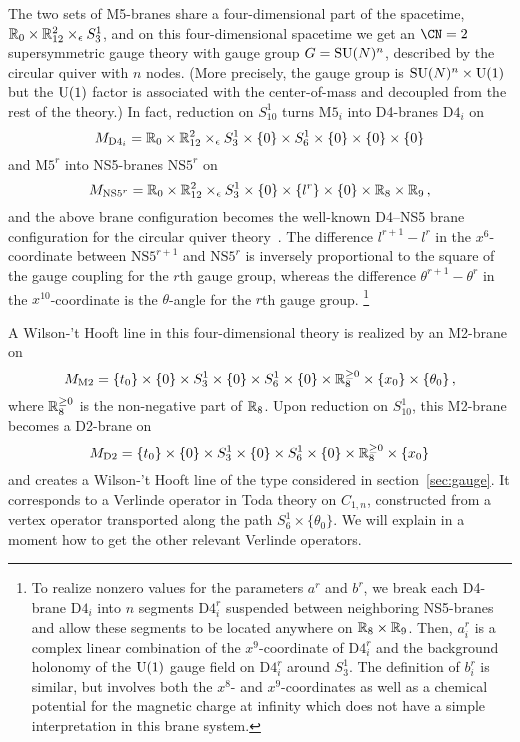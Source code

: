 The two sets of M5-branes share a four-dimensional part of the
spacetime, $\mathbb{R}_0 \times \mathbb{R}^2_{12} \times_\epsilon S^1_3$, and on this
four-dimensional spacetime we get an $\CN = 2$ supersymmetric gauge
theory with gauge group $G = \mathrm{SU}(N)^n$, described by the circular
quiver with $n$ nodes.  (More precisely, the gauge group is
$\mathrm{SU}(N)^n \times \mathrm{U}(1)$ but the $\mathrm{U}(1)$ factor is associated with the
center-of-mass and decoupled from the rest of the theory.)  In fact,
reduction on $S^1_{10}$ turns $\mathrm{M5}_i$ into D4-branes
$\mathrm{D4}_i$ on
\begin{equation}
  M_{\mathrm{D4}_i} =
  \mathbb{R}_0 \times \mathbb{R}^2_{12} \times_\epsilon S^1_3 \times \{0\}
  \times S^1_6 \times \{0\} \times \{0\} \times \{0\}
\end{equation}
and $\mathrm{M5}^r$ into NS5-branes $\mathrm{NS5}^r$ on
\begin{equation}
  M_{\mathrm{NS5}^r} =
  \mathbb{R}_0 \times \mathbb{R}^2_{12} \times_\epsilon S^1_3 \times \{0\}
  \times \{l^r\} \times \{0\} \times \mathbb{R}_8 \times \mathbb{R}_9 \,,
\end{equation}
and the above brane configuration becomes the well-known D4--NS5 brane
configuration for the circular quiver theory~\cite{Witten:1997sc}.
The difference $l^{r+1} - l^r$ in the $x^6$-coordinate between
$\mathrm{NS5}^{r+1}$ and $\mathrm{NS5}^r$ is inversely proportional to
the square of the gauge coupling for the $r$th gauge group, whereas
the difference $\theta^{r+1} - \theta^r$ in the $x^{10}$-coordinate is
the $\theta$-angle for the $r$th gauge group.%
%
\footnote{To realize nonzero values for the parameters $a^r$ and
  $b^r$, we break each D4-brane $\mathrm{D4}_i$ into $n$ segments
  $\mathrm{D4}_i^r$ suspended between neighboring NS5-branes and allow
  these segments to be located anywhere on $\mathbb{R}_8 \times \mathbb{R}_9$.  Then,
  $a^r_i$ is a complex linear combination of the $x^9$-coordinate of
  $\mathrm{D4}_i^r$ and the background holonomy of the $\mathrm{U}(1)$ gauge
  field on $\mathrm{D4}_i^r$ around $S^1_3$.  The definition of
  $b_i^r$ is similar, but involves both the $x^8$- and
  $x^9$-coordinates as well as a chemical potential for the magnetic
  charge at infinity which does not have a simple interpretation in
  this brane system.}

A Wilson-'t Hooft line in this four-dimensional theory is realized by
an M2-brane on
\begin{equation}
  M_{\mathrm{M2}} =
  \{t_0\} \times \{0\} \times S^1_3 \times \{0\}
  \times S^1_6 \times \{0\} \times \mathbb{R}^{\geq0}_8
  \times \{x_0\} \times \{\theta_0\} \,,
\end{equation}
where $\mathbb{R}^{\geq0}_8$ is the non-negative part of $\mathbb{R}_8$.  Upon reduction on $S^1_{10}$, this M2-brane becomes a D2-brane on
\begin{equation}
  M_{\mathrm{D2}} =
  \{t_0\} \times \{0\} \times S^1_3 \times \{0\}
  \times S^1_6 \times \{0\} \times \mathbb{R}^{\geq0}_8
  \times \{x_0\}
\end{equation}
and creates a Wilson-'t Hooft line of the type considered in
section~\ref{sec:gauge}.  It corresponds to a Verlinde operator in
Toda theory on $C_{1,n}$, constructed from a vertex operator
transported along the path $S^1_6 \times \{\theta_0\}$.  We will
explain in a moment how to get the other relevant Verlinde operators.

